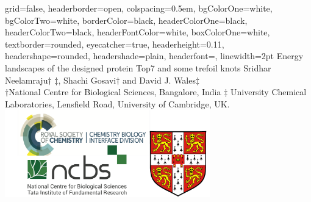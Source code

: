 \documentclass[a0paper,portrait]{baposter}
\begin{document}
\begin{poster}
{
grid=false,
headerborder=open, %
colspacing=0.5em, %
bgColorOne=white, %
bgColorTwo=white, %
borderColor=black, %
headerColorOne=black, %
headerColorTwo=black, %
headerFontColor=white, %
boxColorOne=white, %
textborder=rounded, %
eyecatcher=true, %
headerheight=0.11\textheight, %
headershape=rounded, %
headershade=plain,
headerfont=\Large\textsf, %
linewidth=2pt %
}
{}
%
%
{
\textsf %
{Energy landscapes of the designed protein Top7 and some trefoil knots}
}
{\sf
Sridhar Neelamraju$\dagger$ $\ddagger$, Shachi Gosavi$\dagger$ and David J. Wales$\ddagger$ 
\small{\\$\dagger$National Centre for Biological Sciences, Bangalore, India $\ddagger$ University Chemical Laboratories, Lensfield Road, University of Cambridge, UK.}}{\includegraphics[width=3.5in]{logo.pdf}}


\end{poster}
\end{document}
